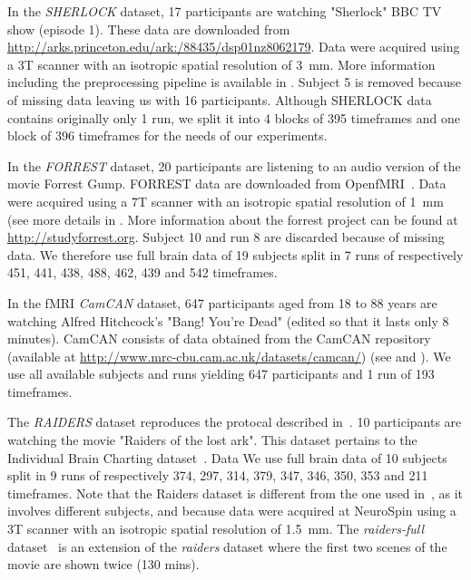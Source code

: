 In the \emph{SHERLOCK} dataset, 17 participants are watching "Sherlock" BBC TV show (episode 1). 
% 
These data are downloaded from \url{http://arks.princeton.edu/ark:/88435/dsp01nz8062179}. 
% 
Data were acquired using a 3T scanner with an isotropic spatial resolution of 3~mm. 
% 
More information including the preprocessing pipeline is available in \cite{sherlock}.
% 
Subject 5 is removed because of missing data leaving us with 16 participants.
% 
Although SHERLOCK data contains originally only 1 run, we split it into 4 blocks of 395 timeframes and one block of 396 timeframes for the needs of our experiments. 

In the \emph{FORREST} dataset, 20 participants are listening to an audio version of the movie Forrest Gump.
% 
FORREST data are downloaded from OpenfMRI~\cite{poldrack2013toward}. 
% 
Data were acquired using a 7T scanner with an isotropic spatial resolution of 1 mm (see more details in \cite{hanke2014high}.
% 
More information about the forrest project can be found at \url{http://studyforrest.org}.
% 
Subject 10 and run 8 are discarded because of missing data.
% 
We therefore use full brain data of 19 subjects split in 7 runs of respectively 451, 441, 438, 488, 462, 439 and 542 timeframes.


In the fMRI \emph{CamCAN} dataset, 647 participants aged from 18 to 88 years are watching Alfred Hitchcock's "Bang! You're Dead" (edited so that it lasts only 8 minutes).
% 
CamCAN consists of data obtained from the CamCAN repository (available at \url{http://www.mrc-cbu.cam.ac.uk/datasets/camcan/}) (see \cite{taylor2017cambridge} and \cite{shafto2014cambridge}).
% 
We use all available subjects and runs yielding 647 participants and 1 run of 193 timeframes.


The \emph{RAIDERS} dataset reproduces the protocal described
in~\cite{haxby2011common}. 10 participants are watching the movie "Raiders
of the lost ark". This dataset pertains to the Individual Brain Charting
dataset~\cite{ibc}.
% 
Data 
% 
We use full brain data of 10 subjects split in 9 runs of respectively 374, 297, 314, 379, 347, 346, 350, 353 and 211 timeframes.
%
Note that the Raiders dataset is different from the one used in~\cite{chen2015reduced}, as it involves different subjects, and because data were acquired at NeuroSpin using a 3T scanner with an isotropic spatial resolution of 1.5 mm.
The \emph{raiders-full} dataset~\cite{ibc} is an extension of the \emph{raiders} dataset where the first two scenes of the movie are shown twice (130 mins).


